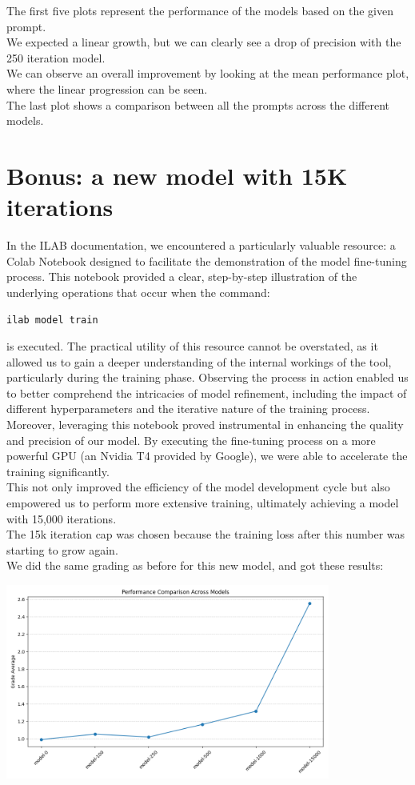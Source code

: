\documentclass[12pt]{article}
\begin{document}
The first five plots represent the performance of the models based on the given prompt.\\
We expected a linear growth, but we can clearly see a drop of precision with the 250 iteration model.\\
We can observe an overall improvement by looking at the mean performance plot, where the linear progression can be seen.\\
The last plot shows a comparison between all the prompts across the different models.

\section{Bonus: a new model with 15K iterations}
In the ILAB documentation, we encountered a particularly valuable resource: a Colab Notebook designed to facilitate the demonstration of the model fine-tuning process. This notebook provided a clear, step-by-step illustration of the underlying operations that occur when the command:
\begin{center}
    \texttt{ilab model train}
\end{center}
is executed. The practical utility of this resource cannot be overstated, as it allowed us to gain a deeper understanding of the internal workings of the tool, particularly during the training phase. Observing the process in action enabled us to better comprehend the intricacies of model refinement, including the impact of different hyperparameters and the iterative nature of the training process.\vspace{14pt}\\
Moreover, leveraging this notebook proved instrumental in enhancing the quality and precision of our model. By executing the fine-tuning process on a more powerful GPU (an Nvidia T4 provided by Google), we were able to accelerate the training significantly.\\
This not only improved the efficiency of the model development cycle but also empowered us to perform more extensive training, ultimately achieving a model with 15,000 iterations.\vspace{14pt}\\
The 15k iteration cap was chosen because the training loss after this number was starting to grow again.\\
We did the same grading as before for this new model, and got these results:
\begin{center}
    \includegraphics[width=0.8\textwidth]{img/plots/15k-mean-performance-comparison.png}
\end{center}
\end{document}

